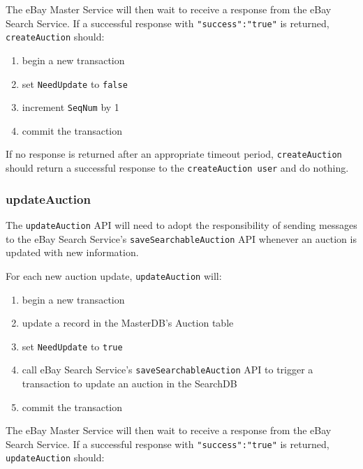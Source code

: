 \documentclass[12pt,a4paper]{article}
\begin{document}
The eBay Master Service will then wait to receive a response from the eBay Search Service. 
If a successful response with \texttt{"success":"true"} is returned, 
\texttt{createAuction} should:

\begin{enumerate}
    \item begin a new transaction
    \item set \texttt{NeedUpdate} to \texttt{false}
    \item increment \texttt{SeqNum} by 1
    \item commit the transaction
\end{enumerate}

If no response is returned after an appropriate timeout period, \texttt{createAuction} 
should return a successful response to the \texttt{createAuction user} and do nothing.



\pagebreak
\subsubsection{updateAuction}

The \texttt{updateAuction} API will need to adopt the responsibility of sending messages to the eBay Search Service's
\texttt{saveSearchableAuction} API whenever an auction is updated with new information.

For each new auction update, \texttt{updateAuction} will:

\begin{enumerate}
    \item begin a new transaction
    \item update a record in the MasterDB's Auction table
    \item set \texttt{NeedUpdate} to \texttt{true}
    \item call eBay Search Service's \texttt{saveSearchableAuction} API to trigger a transaction to update an auction in the SearchDB
    \item commit the transaction
\end{enumerate}


The eBay Master Service will then wait to receive a response from the eBay Search Service. 
If a successful response with \texttt{"success":"true"} is returned, 
 \texttt{updateAuction} should:
 
\end{document}
